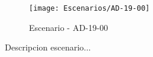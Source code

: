\begin{figure}[H]
\centering
\texttt{[image: Escenarios/AD-19-00]}
\caption{Escenario - AD-19-00}
\label{fig:AD-19-00}
\end{figure}

Descripcion escenario...
\clearpage
